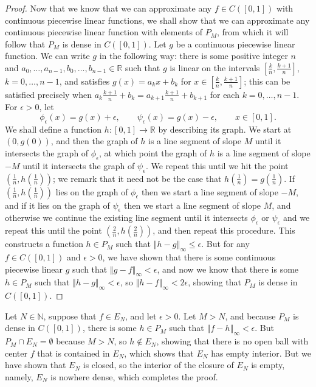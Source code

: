 \documentclass{article}
\newcommand{\norm}[1]{\left\Vert #1 \right\Vert}
\theoremstyle{definition}
\theoremstyle{definition}
\begin{document}
\begin{proof}
Now that we know that we can approximate any $f \in C([0,1])$ with continuous piecewise linear functions, we 
shall show that we can approximate any continuous piecewise linear function with  elements of $P_M$, from which it will follow
that $P_M$ is dense in $C([0,1])$. Let $g$ be a continuous piecewise linear function. We can write
$g$ in the following way: there is some positive integer $n$ and $a_0,\ldots,a_{n-1}, b_0,\ldots,b_{n-1} \in \mathbb{R}$ such that
 $g$ is linear on the intervals $[\frac{k}{n},\frac{k+1}{n}]$, $k=0,\ldots,n-1$, and 
satisfies $g(x)=a_kx+b_k$ for $x \in [\frac{k}{n},\frac{k+1}{n}]$; this can be satisfied  precisely when
$a_k \frac{k+1}{n}+b_k = a_{k+1}\frac{k+1}{n}+b_{k+1}$ for each $k=0,\ldots,n-1$. 
For $\epsilon>0$,
let
\[
\phi_\epsilon(x)=g(x)+\epsilon, \qquad \psi_\epsilon(x)=g(x)-\epsilon, \qquad x \in [0,1].
\]
We shall define a function $h:[0,1] \to \mathbb{R}$ by describing its graph.
We start at $(0,g(0))$, and then the graph of $h$ is a line segment of slope $M$ until it intersects the graph of $\phi_\epsilon$, at which
point the graph of $h$ is a line segment of slope $-M$ until it intersects the graph of $\psi_\epsilon$. We repeat this until we hit
the point $(\frac{1}{n},h(\frac{1}{n}))$; we remark that it need not be the case that  $h(\frac{1}{n})=g(\frac{1}{n})$. If $(\frac{1}{n},h(\frac{1}{n}))$
lies on the graph of $\phi_\epsilon$ then we start a line segment of slope $-M$, and if it lies on the graph
of $\psi_\epsilon$ then we start a line segment of slope $M$, and otherwise we continue the existing line segment until it intersects
$\phi_\epsilon$ or $\psi_\epsilon$ and we repeat this until the point $(\frac{2}{n},h(\frac{2}{n}))$, and then repeat this procedure.
This constructs a function $h \in P_M$ such that $\norm{h-g}_\infty \leq \epsilon$. But for any $f \in C([0,1])$ and $\epsilon>0$,
we have shown that there is some continuous piecewise linear $g$ such that $\norm{g-f}_\infty < \epsilon$, and now we know that there
is some $h \in P_M$ such that $\norm{h-g}_\infty<\epsilon$, so $\norm{h-f}_\infty < 2 \epsilon$, showing that $P_M$ is dense in
$C([0,1])$.
\end{proof}

Let $N \in \mathbb{N}$,
suppose that $f \in E_N$, and let $\epsilon>0$. Let $M>N$, and because $P_M$ is dense in $C([0,1])$,
there is some $h \in P_M$ such that $\norm{f-h}_\infty<\epsilon$.
But $P_M \cap E_N = \emptyset$ because $M>N$, so $h \not \in E_N$, showing that there is no open ball
with center $f$ that is contained in $E_N$, which shows that $E_N$ has empty interior.
But we have shown that $E_N$ is closed, so the interior of the closure of $E_N$ is empty, namely,
$E_N$ is nowhere dense, which completes the proof.
\end{document}

